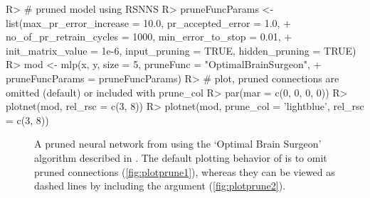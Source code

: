 \documentclass[article,shortnames]{jss}
\begin{document}
\begin{Schunk}
\begin{Sinput}
R> # pruned model using RSNNS
R> pruneFuncParams <- list(max_pr_error_increase = 10.0, pr_accepted_error = 1.0,
+   no_of_pr_retrain_cycles = 1000, min_error_to_stop = 0.01, 
+   init_matrix_value = 1e-6, input_pruning = TRUE, hidden_pruning = TRUE)
R> mod <- mlp(x, y, size = 5, pruneFunc = "OptimalBrainSurgeon",
+  pruneFuncParams = pruneFuncParams)
R> # plot, pruned connections are omitted (default) or included with prune_col
R> par(mar = c(0, 0, 0, 0))
R> plotnet(mod, rel_rsc = c(3, 8))
R> plotnet(mod, prune_col = 'lightblue', rel_rsc = c(3, 8))
\end{Sinput}
\end{Schunk}
\begin{figure}[!ht]
\caption{A pruned neural network from  \citep{Bergmeir12} using the `Optimal Brain Surgeon' algorithm described in \citet{Zell98}.  The default plotting behavior of  is to omit pruned connections (\ref{fig:plotprune1}), whereas they can be viewed as dashed lines by including the  argument (\ref{fig:plotprune2}).}
\label{fig:plotprune}
\end{figure}
\end{document}

